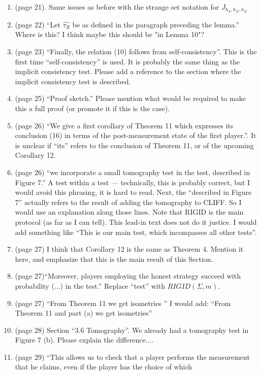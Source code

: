 \documentclass[12pt]{article}
\begin{document}
\begin{enumerate}
     \item (page 21). Same issues as before with the strange set notation for $J_{h_S, h_X, h_Z}$
\item (page 22) ``Let $\hat{\tau_R}$ be as defined in the paragraph preceding the lemma.'' Where is this? I think maybe this should be "in Lemma 10"?
\item (page 23) ``Finally, the relation (10) follows from self-consistency''. This is the first time ``self-consistency'' is used. It is probably the same thing as the implicit consistency test. Please add a reference to the section where the implicit consistency test is described.
 \item (page 25) ``Proof sketch.'' Please mention what would be required to make this a full proof (or promote it if this is the case).
 \item (page 26) ``We give a first corollary of Theorem 11 which expresses its conclusion (16) in terms of the post-measurement
state of the first player.''. It is unclear if ``its'' refers to the conclusion of Theorem 11, or of the upcoming Corollary 12.
\item (page 26) ``we incorporate a
small tomography test in the test, described in Figure 7.'' A test within a test --- technically, this is probably correct, but I would avoid this phrasing, it is hard to read. Next, the ``described in Figure 7'' actually refers to the result of adding the tomography to CLIFF. So I would use an explanation along those lines. Note that RIGID is the main protocol (as far as I can tell). This lead-in text does not do it justice. I would add something like ``This is our main test, which incompasses all other tests''.
\item (page 27) I think that Corollary 12 is the same as Theorem 4. Mention it here, and emphasize that this is the main result of this Section.
\item (page 27)``Moreover, players employing the honest strategy succeed with probability (...) in the test.'' Replace ``test'' with $RIGID(\Sigma,m)$.
\item (page 27) ``From Theorem 11 we get isometries '' I would add: ``From Theorem 11 and part (a) we get isometries''
\item (page 28) Section ``3.6 Tomography''. We already had a tomography test in Figure 7 (b). Please explain the difference....
\item (page 29) ``This allows us
to check that a player performs the measurement that he claims, even if the player has the choice of which

\end{enumerate}
\end{document}
